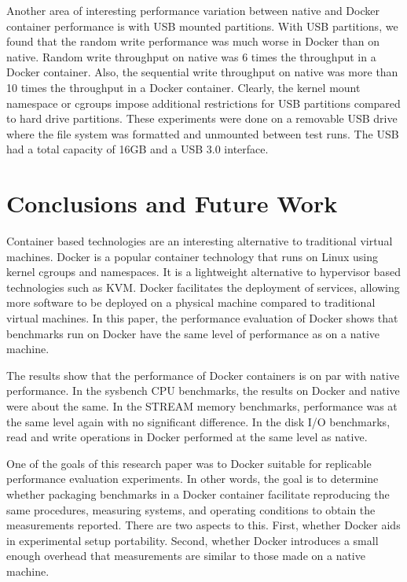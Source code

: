 \documentclass[11pt]{article}
\begin{document}
Another area of interesting performance variation between native and Docker container performance is with USB mounted partitions. With USB partitions, we found that the random write performance was much worse in Docker than on native. Random write throughput on native was 6 times the throughput in a Docker container. Also, the sequential write throughput on native was more than 10 times the throughput in a Docker container. Clearly, the kernel mount namespace or cgroups impose additional restrictions for USB partitions compared to hard drive partitions. These experiments were done on a removable USB drive where the file system was formatted and unmounted between test runs. The USB had a total capacity of 16GB and a USB 3.0 interface. 

\section{Conclusions and Future Work}

Container based technologies are an interesting alternative to traditional virtual machines. Docker is a popular container technology that runs on Linux using kernel cgroups and namespaces. It is a lightweight alternative to hypervisor based technologies such as KVM. Docker facilitates the deployment of services, allowing more software to be deployed on a physical machine compared to traditional virtual machines. In this paper, the performance evaluation of Docker shows that benchmarks run on Docker have the same level of performance as on a native machine. 

The results show that the performance of Docker containers is on par with native performance. In the sysbench CPU benchmarks, the results on Docker and native were about the same. In the STREAM memory benchmarks, performance was at the same level again with no significant difference. In the disk I/O benchmarks, read and write operations in Docker performed at the same level as native. 

One of the goals of this research paper was to Docker suitable for replicable performance evaluation experiments. In other words, the goal is to determine whether packaging benchmarks in a Docker container facilitate reproducing the same procedures, measuring systems, and operating conditions to obtain the measurements reported. There are two aspects to this. First, whether Docker aids in experimental setup portability. Second, whether Docker introduces a small enough overhead that measurements are similar to those made on a native machine. 
\end{document}
